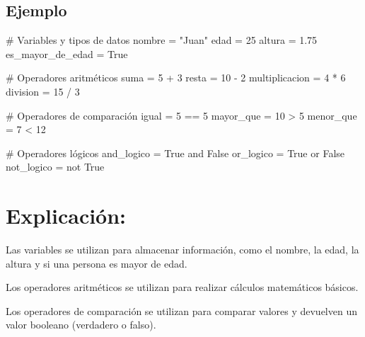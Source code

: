 \documentclass[
  a4paper,
  DIV=11,
  numbers=noendperiod,
  onepage,
  openany]{scrreprt}
\newenvironment{Shaded}{\begin{snugshade}}{\end{snugshade}}
\newcommand{\CommentTok}[1]{\textcolor[rgb]{0.37,0.37,0.37}{#1}}
\newcommand{\DecValTok}[1]{\textcolor[rgb]{0.68,0.00,0.00}{#1}}
\newcommand{\FloatTok}[1]{\textcolor[rgb]{0.68,0.00,0.00}{#1}}
\newcommand{\KeywordTok}[1]{\textcolor[rgb]{0.00,0.23,0.31}{#1}}
\newcommand{\NormalTok}[1]{\textcolor[rgb]{0.00,0.23,0.31}{#1}}
\newcommand{\OperatorTok}[1]{\textcolor[rgb]{0.37,0.37,0.37}{#1}}
\newcommand{\StringTok}[1]{\textcolor[rgb]{0.13,0.47,0.30}{#1}}
\newcommand{\VariableTok}[1]{\textcolor[rgb]{0.07,0.07,0.07}{#1}}
\begin{document}
\hypertarget{ejemplo-4}{%
\subsection{Ejemplo}\label{ejemplo-4}}

\begin{Shaded}
\begin{Highlighting}[]

\CommentTok{\# Variables y tipos de datos}
\NormalTok{nombre }\OperatorTok{=} \StringTok{"Juan"}
\NormalTok{edad }\OperatorTok{=} \DecValTok{25}
\NormalTok{altura }\OperatorTok{=} \FloatTok{1.75}
\NormalTok{es\_mayor\_de\_edad }\OperatorTok{=} \VariableTok{True}

\CommentTok{\# Operadores aritméticos}
\NormalTok{suma }\OperatorTok{=} \DecValTok{5} \OperatorTok{+} \DecValTok{3}
\NormalTok{resta }\OperatorTok{=} \DecValTok{10} \OperatorTok{{-}} \DecValTok{2}
\NormalTok{multiplicacion }\OperatorTok{=} \DecValTok{4} \OperatorTok{*} \DecValTok{6}
\NormalTok{division }\OperatorTok{=} \DecValTok{15} \OperatorTok{/} \DecValTok{3}

\CommentTok{\# Operadores de comparación}
\NormalTok{igual }\OperatorTok{=} \DecValTok{5} \OperatorTok{==} \DecValTok{5}
\NormalTok{mayor\_que }\OperatorTok{=} \DecValTok{10} \OperatorTok{\textgreater{}} \DecValTok{5}
\NormalTok{menor\_que }\OperatorTok{=} \DecValTok{7} \OperatorTok{\textless{}} \DecValTok{12}

\CommentTok{\# Operadores lógicos}
\NormalTok{and\_logico }\OperatorTok{=} \VariableTok{True} \KeywordTok{and} \VariableTok{False}
\NormalTok{or\_logico }\OperatorTok{=} \VariableTok{True} \KeywordTok{or} \VariableTok{False}
\NormalTok{not\_logico }\OperatorTok{=} \KeywordTok{not} \VariableTok{True}
\end{Highlighting}
\end{Shaded}

\hypertarget{explicaciuxf3n-4}{%
\section{Explicación:}\label{explicaciuxf3n-4}}

Las variables se utilizan para almacenar información, como el nombre, la
edad, la altura y si una persona es mayor de edad.

Los operadores aritméticos se utilizan para realizar cálculos
matemáticos básicos.

Los operadores de comparación se utilizan para comparar valores y
devuelven un valor booleano (verdadero o falso).
\end{document}
